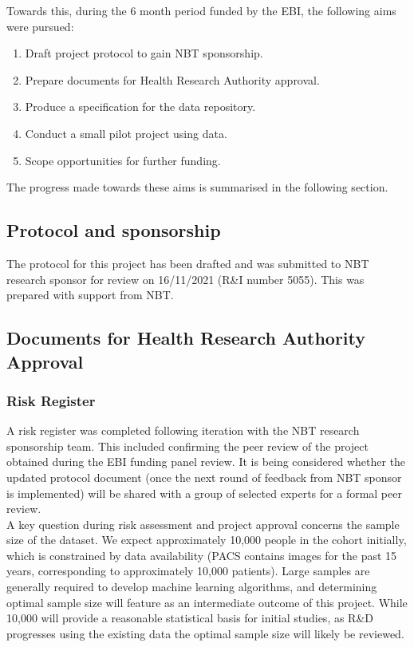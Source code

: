 \documentclass{article}
\begin{document}
\noindent Towards this, during the 6 month period funded by the EBI, the
following aims were pursued:
\begin{enumerate}
\item Draft project protocol to gain NBT sponsorship.
\item Prepare documents for Health Research Authority approval.
\item Produce a specification for the data repository.
\item Conduct a small pilot project using data.
\item Scope opportunities for further funding.
\end{enumerate}

\noindent The progress made towards these aims is summarised in the following
section.
\subsection{Protocol and sponsorship}

The protocol for this project has been drafted and was submitted to
NBT research sponsor for review on 16/11/2021 (R\&I number 5055). This was prepared with
support from NBT.\\

\subsection{Documents for Health Research Authority Approval}

\subsubsection{Risk Register}
A risk register was completed following iteration with the NBT
research sponsorship team. This included confirming the peer review of
the project obtained during the EBI funding panel review. It is
being considered whether the updated protocol document (once the next round of feedback from NBT
sponsor is implemented) will be shared with a group of selected
experts for a formal peer review.\\

A key question during risk assessment and project approval concerns
the sample size of the dataset. We expect approximately 10,000 people
in the cohort initially, which is constrained by data availability
(PACS contains images for the past 15 years, corresponding to
approximately 10,000 patients).
Large samples are generally required to develop machine learning
algorithms, and determining optimal sample size will feature as an
intermediate outcome of this project. While 10,000 will provide a
reasonable statistical basis for initial studies, as R\&D progresses
using the existing data the optimal sample size will likely be
reviewed.\\
\end{document}
